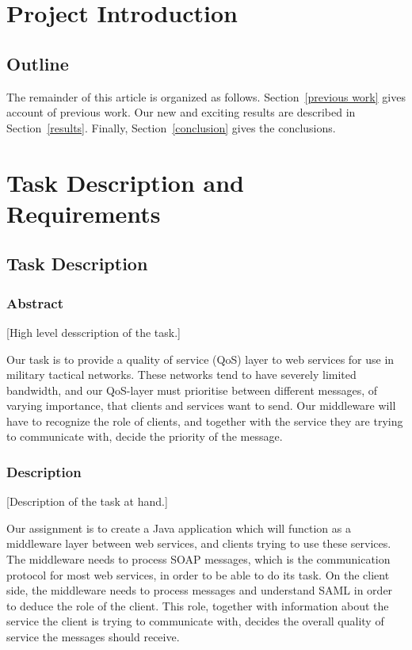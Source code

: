 \documentclass[12pt]{article}
\begin{document}
\tableofcontents
\listoffigures
\listoftables
\newpage

\section{Project Introduction}\label{intoduction}
\subsection{Outline}\label{outline} 
The remainder of this article is organized as follows. Section~\ref{previous work} gives account of previous work. Our new and exciting results are described in Section~\ref{results}. Finally, Section~\ref{conclusion} gives the conclusions.

\section{Task Description and Requirements}\label{taskdescreq}
    \subsection{Task Description}\label{taskdef}
        \subsubsection{Abstract}\label{taskabst} 
        [High level desscription of the task.]
        
        Our task is to provide a quality of service (QoS) layer to web services for use in military tactical networks. These networks tend to have severely limited bandwidth, and our QoS-layer must prioritise between different messages, of varying importance, that clients and services want to send. Our middleware will have to recognize the role of clients, and together with the service they are trying to communicate with, decide the priority of the message.
        \subsubsection{Description}\label{taskdesc} 
        [Description of the task at hand.]
        
        Our assignment is to create a Java application which will function as a middleware layer between web services, and clients trying to use these services. The middleware needs to process SOAP messages, which is the communication protocol for most web services, in order to be able to do its task. On the client side, the middleware needs to process messages and understand SAML in order to deduce the role of the client. This role, together with information about the service the client is trying to communicate with, decides the overall quality of service the messages should receive. 
\end{document}
